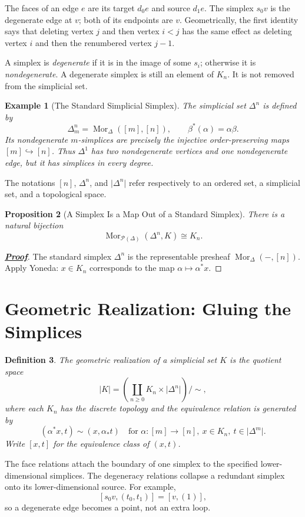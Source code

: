 \documentclass[11pt]{article}
\newcommand{\proofdest}{}
\newcommand{\claim}[1]{\def\proofdest{proof:#1}\hypertarget{statement:#1}{}}
\theoremstyle{linked}
\newtheorem{proposition}{Proposition}[section]
\theoremstyle{plainlecture}
\newtheorem{definition}[proposition]{Definition}
\newtheorem{example}[proposition]{Example}
\newenvironment{linkedproof}[1]{\hypertarget{proof:#1}{}\begin{proof}[\normalfont\bfseries\hyperlink{statement:#1}{Proof}]}{\end{proof}}
\newcommand{\Mor}{\operatorname{Mor}}
\newcommand{\PSh}{\mathcal{P}}
\begin{document}
The faces of an edge $e$ are its target $d_0e$ and source $d_1e$. The simplex $s_0v$ is the degenerate edge at $v$; both of its endpoints are $v$. Geometrically, the first identity says that deleting vertex $j$ and then vertex $i<j$ has the same effect as deleting vertex $i$ and then the renumbered vertex $j-1$.

A simplex is \emph{degenerate} if it is in the image of some $s_i$; otherwise it is \emph{nondegenerate}. A degenerate simplex is still an element of $K_n$. It is not removed from the simplicial set.

\begin{example}[The Standard Simplicial Simplex]
The simplicial set $\Delta^{n}$ is defined by
\[
\Delta^{n}_m=\Mor_\Delta([m],[n]),
\qquad \beta^*(\alpha)=\alpha\beta.
\]
Its nondegenerate $m$-simplices are precisely the injective order-preserving maps $[m]\hookrightarrow[n]$. Thus $\Delta^{1}$ has two nondegenerate vertices and one nondegenerate edge, but it has simplices in every degree.
\end{example}
The notations $[n]$, $\Delta^{n}$, and $\lvert\Delta^{n}\rvert$ refer respectively to an ordered set, a simplicial set, and a topological space.

\claim{yoneda}
\begin{proposition}[A Simplex Is a Map Out of a Standard Simplex]
There is a natural bijection
\[
\Mor_{\PSh(\Delta)}(\Delta^{n},K)\cong K_n.
\]
\end{proposition}
\begin{linkedproof}{yoneda}
The standard simplex $\Delta^n$ is the representable presheaf $\Mor_{\Delta}(-,[n])$. Apply Yoneda: $x\in K_n$ corresponds to the map $\alpha\mapsto\alpha^*x$.
\end{linkedproof}

\section{Geometric Realization: Gluing the Simplices}
\begin{definition}
The geometric realization of a simplicial set $K$ is the quotient space
\[
|K|=\left(\coprod_{n\geq0} K_n\times\lvert\Delta^{n}\rvert\right)\big/\sim,
\]
where each $K_n$ has the discrete topology and the equivalence relation is generated by
\[
(\alpha^*x,t)\sim(x,\alpha_*t)
\quad\text{for }\alpha:[m]\to[n],\ x\in K_n,\ t\in\lvert\Delta^{m}\rvert.
\]
Write $[x,t]$ for the equivalence class of $(x,t)$.
\end{definition}
The face relations attach the boundary of one simplex to the specified lower-dimensional simplices. The degeneracy relations collapse a redundant simplex onto its lower-dimensional source. For example,
\[
[s_0v,(t_0,t_1)]=[v,(1)],
\]
so a degenerate edge becomes a point, not an extra loop.
\end{document}

